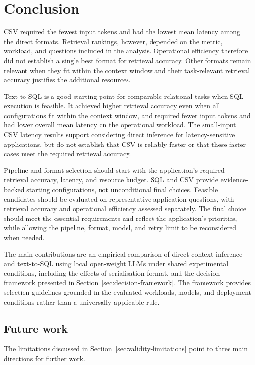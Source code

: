 \chapter{Conclusion} \label{ch:conclusion}

CSV required the fewest input tokens and had the lowest mean latency among the direct formats. Retrieval
rankings, however, depended on the metric, workload, and questions included in the analysis. Operational
efficiency therefore did not establish a single best format for retrieval accuracy. Other formats remain
relevant when they fit within the context window and their task-relevant retrieval accuracy justifies the
additional resources.

Text-to-SQL is a good starting point for comparable relational tasks when SQL execution is feasible. It
achieved higher retrieval accuracy even when all configurations fit within the context
window, and required fewer input tokens and had lower overall mean latency on the operational workload.
The small-input CSV latency results support considering direct inference for latency-sensitive applications,
but do not establish that CSV is reliably faster or that these faster cases meet the required retrieval accuracy.

Pipeline and format selection should start with the application's required retrieval accuracy, latency, and
resource budget. SQL and CSV provide evidence-backed starting configurations, not unconditional final
choices. Feasible candidates should be evaluated on representative application questions, with retrieval
accuracy and operational efficiency assessed separately. The final choice should meet the essential
requirements and reflect the application's priorities, while allowing the pipeline, format, model, and retry
limit to be reconsidered when needed.

The main contributions are an empirical comparison of direct context inference and text-to-SQL using local
open-weight LLMs under shared experimental conditions, including the effects of serialisation format, and
the decision framework presented in Section~\ref{sec:decision-framework}. The framework provides selection
guidelines grounded in the evaluated workloads, models, and deployment conditions rather than a universally
applicable rule.

\section{Future work}

The limitations discussed in Section~\ref{sec:validity-limitations} point to three main directions for further work.

